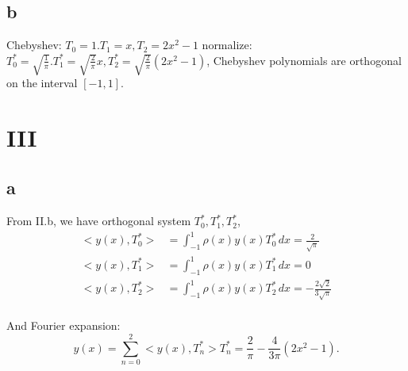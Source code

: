 \documentclass[a4paper]{article}
\begin{document}
\subsection*{b}
Chebyshev: $T_{0}=1. T_{1}=x, T_{2}=2x^{2}-1$
normalize: $T^{*}_{0}=\sqrt{\frac{1}{\pi}}. T^{*}_{1}=\sqrt{\frac{2}{\pi}}x, T^{*}_{2}=\sqrt{\frac{2}{\pi}}(2x^{2}-1)$,
Chebyshev polynomials are orthogonal on the interval $[-1,1]$.

\section*{III}

\subsection*{a}
From II.b, we have orthogonal system ${T_{0}^{*}, T_{1}^{*}, T_{2}^{*}}$,
\begin{align}
    <y(x), T_{0}^{*}> &= \int_{-1}^{1} \rho(x) y(x)T_{0}^{*} \,dx = \frac{2}{\sqrt{\pi}}\\
    <y(x), T_{1}^{*}> &= \int_{-1}^{1} \rho(x) y(x)T_{1}^{*} \,dx = 0 \\
    <y(x), T_{2}^{*}> &= \int_{-1}^{1} \rho(x) y(x)T_{2}^{*} \,dx = -\frac{2\sqrt{2}}{3\sqrt{\pi}}\\
\end{align}

And Fourier expansion:
$$y(x) = \sum_{n = 0}^{2} <y(x), T_{n}^{*}>T_{n}^{*} = \frac{2}{\pi} - \frac{4}{3\pi}(2x^{2} - 1). $$
\end{document}
